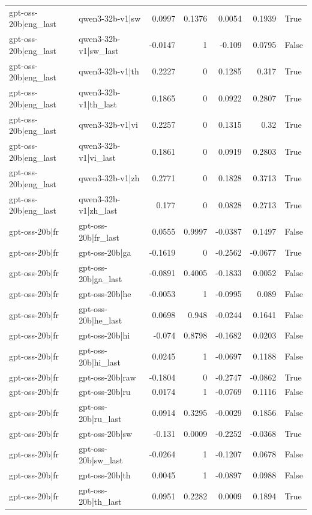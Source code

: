 \begin{table}
\begin{tabular}{l l r r r r l}
gpt-oss-20b|eng_last & qwen3-32b-v1|sw & 0.0997 & 0.1376 & 0.0054 & 0.1939 & True \\
gpt-oss-20b|eng_last & qwen3-32b-v1|sw_last & -0.0147 & 1 & -0.109 & 0.0795 & False \\
gpt-oss-20b|eng_last & qwen3-32b-v1|th & 0.2227 & 0 & 0.1285 & 0.317 & True \\
gpt-oss-20b|eng_last & qwen3-32b-v1|th_last & 0.1865 & 0 & 0.0922 & 0.2807 & True \\
gpt-oss-20b|eng_last & qwen3-32b-v1|vi & 0.2257 & 0 & 0.1315 & 0.32 & True \\
gpt-oss-20b|eng_last & qwen3-32b-v1|vi_last & 0.1861 & 0 & 0.0919 & 0.2803 & True \\
gpt-oss-20b|eng_last & qwen3-32b-v1|zh & 0.2771 & 0 & 0.1828 & 0.3713 & True \\
gpt-oss-20b|eng_last & qwen3-32b-v1|zh_last & 0.177 & 0 & 0.0828 & 0.2713 & True \\
gpt-oss-20b|fr & gpt-oss-20b|fr_last & 0.0555 & 0.9997 & -0.0387 & 0.1497 & False \\
gpt-oss-20b|fr & gpt-oss-20b|ga & -0.1619 & 0 & -0.2562 & -0.0677 & True \\
gpt-oss-20b|fr & gpt-oss-20b|ga_last & -0.0891 & 0.4005 & -0.1833 & 0.0052 & False \\
gpt-oss-20b|fr & gpt-oss-20b|he & -0.0053 & 1 & -0.0995 & 0.089 & False \\
gpt-oss-20b|fr & gpt-oss-20b|he_last & 0.0698 & 0.948 & -0.0244 & 0.1641 & False \\
gpt-oss-20b|fr & gpt-oss-20b|hi & -0.074 & 0.8798 & -0.1682 & 0.0203 & False \\
gpt-oss-20b|fr & gpt-oss-20b|hi_last & 0.0245 & 1 & -0.0697 & 0.1188 & False \\
gpt-oss-20b|fr & gpt-oss-20b|raw & -0.1804 & 0 & -0.2747 & -0.0862 & True \\
gpt-oss-20b|fr & gpt-oss-20b|ru & 0.0174 & 1 & -0.0769 & 0.1116 & False \\
gpt-oss-20b|fr & gpt-oss-20b|ru_last & 0.0914 & 0.3295 & -0.0029 & 0.1856 & False \\
gpt-oss-20b|fr & gpt-oss-20b|sw & -0.131 & 0.0009 & -0.2252 & -0.0368 & True \\
gpt-oss-20b|fr & gpt-oss-20b|sw_last & -0.0264 & 1 & -0.1207 & 0.0678 & False \\
gpt-oss-20b|fr & gpt-oss-20b|th & 0.0045 & 1 & -0.0897 & 0.0988 & False \\
gpt-oss-20b|fr & gpt-oss-20b|th_last & 0.0951 & 0.2282 & 0.0009 & 0.1894 & True \\

\end{tabular}
\end{table}
